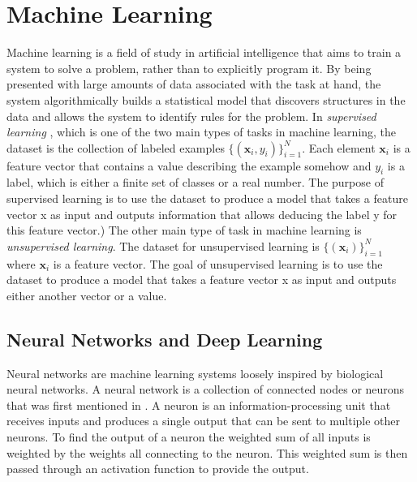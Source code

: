 \documentclass[nofilelist]{cslthse-msc}
\begin{document}
\section{Machine Learning}
Machine learning \citep{franoischollet2017learning} is a field of study in artificial intelligence that aims to train a system to solve a problem, rather than to explicitly program it. By being presented with large amounts of data associated with the task at hand, the system algorithmically builds a statistical model that discovers structures in the data and allows the system to identify rules for the problem. 
In \textit{supervised learning} \citep{100pageBurkov}, which is one of the two main types of tasks in machine learning, the dataset is the collection of labeled examples $\{(\mathbf{x}_i, y_i)\}_{i=1}^N.$ Each element $\mathbf{x}_i$ is a feature vector that contains a value describing the example somehow and $y_i$ is a label, which is either a finite set of classes or a real number. The purpose of supervised learning is to use the dataset to produce a model that takes a feature vector x as input and outputs information that allows deducing the label y for this feature vector.) 
The other main type of task in machine learning is \textit{unsupervised learning}. The dataset for unsupervised learning is $\{ (\mathbf{x}_i)\}_{i=1}^N$ where $\mathbf{x}_i$ is a feature vector. The goal of unsupervised learning is to use the dataset to produce a model that takes a feature vector x as input and outputs either another vector or a value. 





\subsection{Neural Networks and Deep Learning}

Neural networks are machine learning systems loosely inspired by biological neural networks. A neural network is a collection of connected nodes or neurons that was first mentioned in \citet{mcculloch1943}. A neuron \citep{dawson1998ann} is an information-processing unit that receives inputs and produces a single output that can be sent to multiple other neurons. To find the output of a neuron the weighted sum of all inputs is weighted by the weights all connecting to the neuron. This weighted sum is then passed through an activation function to provide the output.


\end{document}
